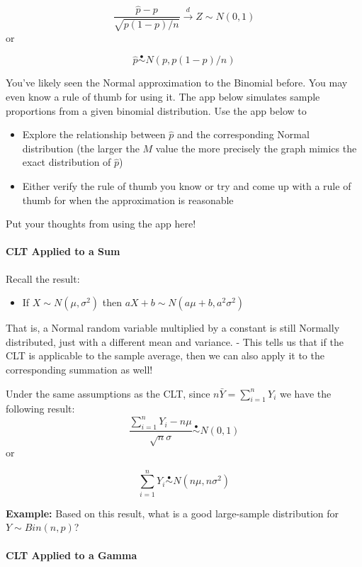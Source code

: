 \documentclass[
]{article}
\providecommand{\tightlist}{%
  \setlength{\itemsep}{0pt}\setlength{\parskip}{0pt}}
\begin{document}
\[\frac{\hat{p}-p}{\sqrt{p(1-p)/n}} \stackrel{d}\rightarrow Z\sim N(0,1)\]
or

\[\hat{p}\stackrel{\bullet}\sim N(p, p(1-p)/n)\]

You've likely seen the Normal approximation to the Binomial before. You
may even know a rule of thumb for using it. The app below simulates
sample proportions from a given binomial distribution. Use the app below
to

\begin{itemize}
\tightlist
\item
  Explore the relationship between \(\hat{p}\) and the corresponding
  Normal distribution (the larger the \(M\) value the more precisely the
  graph mimics the exact distribution of \(\hat{p}\))
\item
  Either verify the rule of thumb you know or try and come up with a
  rule of thumb for when the approximation is reasonable
\end{itemize}

Put your thoughts from using the app here!

\hypertarget{clt-applied-to-a-sum}{%
\paragraph{CLT Applied to a Sum}\label{clt-applied-to-a-sum}}

Recall the result:

\begin{itemize}
\tightlist
\item
  If \(X\sim N(\mu, \sigma^2)\) then \(aX+b\sim N(a\mu+b,a^2\sigma^2)\)
\end{itemize}

That is, a Normal random variable multiplied by a constant is still
Normally distributed, just with a different mean and variance. - This
tells us that if the CLT is applicable to the sample average, then we
can also apply it to the corresponding summation as well!

Under the same assumptions as the CLT, since
\(n\bar{Y} = \sum_{i=1}^{n}Y_i\) we have the following result:
\[\frac{\sum_{i=1}^{n} Y_i -n\mu}{\sqrt{n}\sigma}\stackrel{\bullet}{\sim}N(0, 1)\]
or

\[\sum_{i=1}^{n} Y_i \stackrel{\bullet}{\sim}N(n\mu, n\sigma^2)\]

\textbf{Example:} Based on this result, what is a good large-sample
distribution for \(Y\sim Bin(n, p)\)?

\hypertarget{clt-applied-to-a-gamma}{%
\paragraph{CLT Applied to a Gamma}\label{clt-applied-to-a-gamma}}
\end{document}
